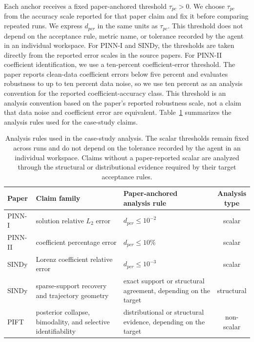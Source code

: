 \documentclass[authoryear,5p,times,nopreprintline]{elsarticle}
\begin{document}
Each anchor receives a fixed paper-anchored threshold \(\tau_{pc}>0\).
We choose \(\tau_{pc}\) from the accuracy scale reported for that paper claim and fix it before comparing repeated runs.
We express \(d_{pcr}\) in the same units as \(\tau_{pc}\).
This threshold does not depend on the acceptance rule, metric name, or tolerance recorded by the agent in an individual workspace.
For PINN-I and SINDy, the thresholds are taken directly from the reported error scales in the source papers.
For PINN-II coefficient identification, we use a ten-percent coefficient-error threshold.
The paper reports clean-data coefficient errors below five percent and evaluates robustness to up to ten percent data noise, so we use ten percent as an analysis convention for the reported coefficient-accuracy class.
This threshold is an analysis convention based on the paper's reported robustness scale, not a claim that data noise and coefficient error are equivalent.
Table~\ref{tab:case_study_thresholds} summarizes the analysis rules used for the case-study claims.

\begin{table}[t]
\centering
\footnotesize
\setlength{\tabcolsep}{3pt}
\renewcommand{\arraystretch}{1.08}
\begin{tabularx}{\columnwidth}{@{}l
  >{\raggedright\arraybackslash}X
  >{\raggedright\arraybackslash}X
  c@{}}
\toprule
Paper & Claim family & \makecell[l]{Paper-anchored\\analysis rule} & \makecell{Analysis\\type} \\
\midrule
PINN-I & solution relative \(L_2\) error & \(d_{pcr}\le 10^{-2}\) & scalar \\
PINN-II & coefficient percentage error & \(d_{pcr}\le 10\%\) & scalar \\
SINDy & Lorenz coefficient relative error & \(d_{pcr}\le 10^{-3}\) & scalar \\
\midrule
SINDy & sparse-support recovery and trajectory geometry & exact support or structural agreement, depending on the target & structural \\
PIFT & posterior collapse, bimodality, and selective identifiability & distributional or structural evidence, depending on the target & non-scalar \\
\bottomrule
\end{tabularx}
\caption{Analysis rules used in the case-study analysis. The scalar thresholds remain fixed across runs and do not depend on the tolerance recorded by the agent in an individual workspace. Claims without a paper-reported scalar are analyzed through the structural or distributional evidence required by their target acceptance rules.}
\label{tab:case_study_thresholds}
\end{table}
\end{document}
